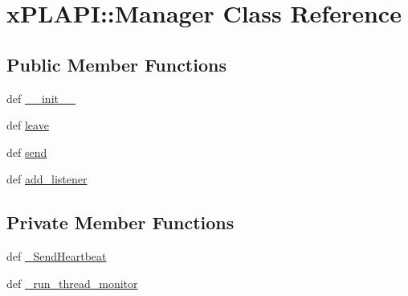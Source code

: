 \hypertarget{classxPLAPI_1_1Manager}{
\section{xPLAPI::Manager Class Reference}
\label{classxPLAPI_1_1Manager}
}
\subsection*{Public Member Functions}
\begin{CompactItemize}
\item 
def \hyperlink{classxPLAPI_1_1Manager_57252f423d02495f598f858e9c699d38}{\_\-\_\-init\_\-\_\-}
\item 
def \hyperlink{classxPLAPI_1_1Manager_c955c61a27cc1b91885632576bf2c13d}{leave}
\item 
def \hyperlink{classxPLAPI_1_1Manager_98293b52fe5999a6bdfbe1cf17d08eb7}{send}
\item 
def \hyperlink{classxPLAPI_1_1Manager_e40b7a76258786cbf63ae2374b28c053}{add\_\-listener}
\end{CompactItemize}
\subsection*{Private Member Functions}
\begin{CompactItemize}
\item 
def \hyperlink{classxPLAPI_1_1Manager_c4032a0074505d88356fbc04468ca01c}{\_\-SendHeartbeat}
\item 
def \hyperlink{classxPLAPI_1_1Manager_f3b6bb58d65bbacf144099c29389481b}{\_\-run\_\-thread\_\-monitor}
\end{CompactItemize}
